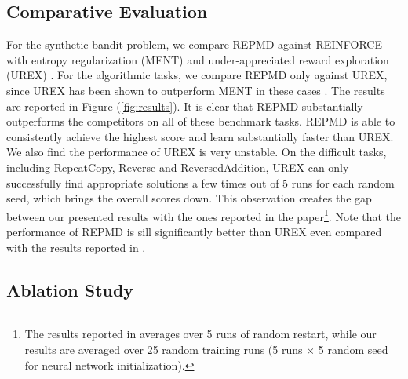 \subsection{Comparative Evaluation}

For the synthetic bandit problem, we compare REPMD against REINFORCE with entropy regularization (MENT) \citep{williams1992simple} and under-appreciated reward exploration (UREX) \citep{nachum2017improving}. For the algorithmic tasks, we compare REPMD only against UREX, since UREX has been shown to outperform MENT in these cases \citep{nachum2017improving}. The results are reported in Figure (\ref{fig:results}). It is clear that REPMD substantially outperforms the competitors on all of these benchmark tasks. REPMD is able to consistently achieve the highest score and learn substantially faster than UREX. We also find the performance of UREX is very unstable. On the difficult tasks, including RepeatCopy, Reverse and ReversedAddition, UREX can only successfully find appropriate solutions a few times out of 5 runs for each random seed, which brings the overall scores down. This observation creates the gap between our presented results with the ones reported in the paper\footnote{The results reported in \citet{nachum2017improving} averages over 5 runs of random restart, while our results are averaged over 25 random training runs (5 runs $\times$ 5 random seed for neural network initialization). }. Note that the performance of REPMD is sill significantly better than UREX even compared with the results reported in \citet{nachum2017improving}. 


\subsection{Ablation Study}
\label{subsec:ablationstudy}

